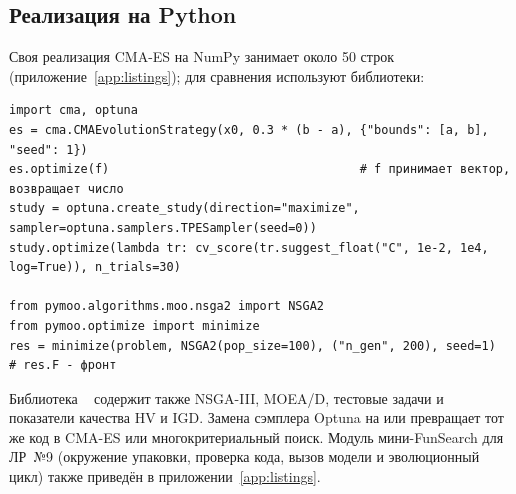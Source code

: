 \subsection{Реализация на Python}
\label{sec:py-modern}

Своя реализация CMA-ES на NumPy занимает около 50 строк (приложение~\ref{app:listings}); для сравнения
используют библиотеки:
\begin{lstlisting}
import cma, optuna
es = cma.CMAEvolutionStrategy(x0, 0.3 * (b - a), {"bounds": [a, b], "seed": 1})
es.optimize(f)                                   # f принимает вектор, возвращает число
study = optuna.create_study(direction="maximize", sampler=optuna.samplers.TPESampler(seed=0))
study.optimize(lambda tr: cv_score(tr.suggest_float("C", 1e-2, 1e4, log=True)), n_trials=30)

from pymoo.algorithms.moo.nsga2 import NSGA2
from pymoo.optimize import minimize
res = minimize(problem, NSGA2(pop_size=100), ("n_gen", 200), seed=1)   # res.F - фронт
\end{lstlisting}
Библиотека ~\cite{blank2020} содержит также NSGA-III, MOEA/D, тестовые задачи и показатели
качества HV и IGD.
Замена сэмплера Optuna на  или  превращает тот же код в CMA-ES
или многокритериальный поиск. Модуль мини-FunSearch для ЛР~№9 (окружение упаковки, проверка кода,
вызов модели и эволюционный цикл) также приведён в приложении~\ref{app:listings}.
